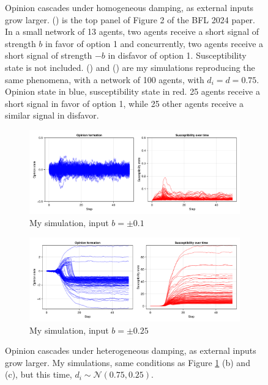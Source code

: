 \documentclass[]{article}
\begin{document}
\begin{figure}
	\caption{Opinion cascades under homogeneous damping, as external inputs grow larger. () is the top panel of Figure 2 of the BFL 2024 paper. In a small network of 13 agents, two agents receive a short signal of strength $b$ in favor of option 1 and concurrently, two agents receive a short signal of strength $-b$ in disfavor of option 1. Susceptibility state is not included. () and () are my simulations reproducing the same phenomena, with a network of 100 agents, with $d_i=d=0.75$. Opinion state in blue, susceptibility state in red. 25 agents receive a short signal in favor of option 1, while 25 other agents receive a similar signal in disfavor. }\label{fig:homdamping}
\end{figure}


\begin{figure}
	\centering
	\begin{subfigure}[t]{0.6\textwidth}
		\centering
		\includegraphics[width=\textwidth]{../plots/nog_hetd_lowsig.png} 
		\caption{My simulation, input $b = \pm 0.1 $} \label{fig:hetdamping1}
	\end{subfigure}
	
	\begin{subfigure}[t]{0.6\textwidth}
		\centering
		\includegraphics[width=\textwidth]{../plots/nog_hetd_medsig.png} 
		\caption{My simulation, input $b = \pm 0.25 $} \label{fig:hetdamping2}
	\end{subfigure}
	
	\caption{Opinion cascades under heterogeneous damping, as external inputs grow larger. My simulations, same conditions as Figure \ref{fig:homdamping} (b) and (c), but this time, $d_i \sim \mathcal{N}(0.75,0.25)$.}\label{fig:hetdamping}
\end{figure}
\end{document}
